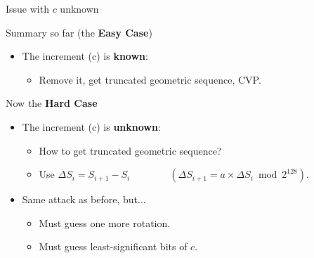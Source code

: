 
\begin{frame}[label=hard]{Issue with $c$ unknown}

  \begin{exampleblock}{Summary so far (the \textbf{Easy Case})}
    \begin{itemize}
    \item The \alert{increment} (\alert{c}) is \textbf{known}:
      \begin{itemize}
      \item Remove it, get truncated geometric sequence, CVP.
      \end{itemize}
    \end{itemize}
  \end{exampleblock}
  
  \begin{alertblock}{Now the \textbf{Hard Case}}
    \begin{itemize}
    \item The \alert{increment} (\alert{c}) is \textbf{unknown}:
      \begin{itemize}
      \item How to get truncated geometric sequence?
      \item Use $\Delta S_i = S_{i+1} - S_i \qquad\qquad (\Delta S_{i+1} = a \times \Delta S_i \bmod 2^{128})$.
      \end{itemize}
      \pause
    \item Same attack as before, but...
      \begin{itemize}
    \item Must guess one more rotation.
    \item Must guess least-significant bits of \alert{$c$}.
    \end{itemize}
  \end{itemize}
  \end{alertblock}
\end{frame}



